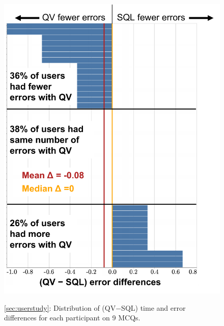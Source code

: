 \documentclass[letterpaper,11pt]{article}
\begin{document}
\begin{figure}[t]
{    \includegraphics[scale=0.44]{figs/Fig_error_differences_no_grouping_v2.pdf}
	\label{figure:error_differences_no_grouping}
}
\caption{\autoref{sec:userstudy}:
Distribution of (QV$-$SQL) time and error differences for each participant on 9 MCQs.
}
\label{figure:differences_no_grouping}
\end{figure}
















\end{document}
